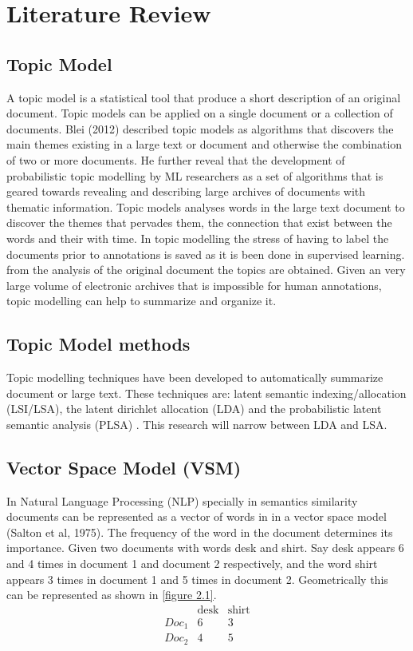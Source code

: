 \chapter{Literature Review}
\section{Topic Model}  
A topic model is a statistical tool that produce a short description of an original document. Topic models can be applied on a single document or a collection of documents. Blei (2012) described topic models as algorithms that discovers the main themes existing in a large text or document and otherwise the combination of two or more documents. He further reveal that the development of probabilistic topic modelling by ML  researchers as a set of algorithms that is geared towards revealing and describing large archives of documents with thematic information. Topic models analyses words in the large text document to discover the themes that pervades them, the connection that exist between the words and their with time. In topic modelling the stress of having to label the documents prior to annotations is saved as it is been done in supervised learning. from the analysis of the original document the topics are obtained. Given an very large volume of electronic archives that is impossible for human annotations, topic modelling can help to summarize and organize it.
\section{Topic Model methods}
Topic modelling techniques have been developed to automatically summarize document or large text. These techniques are: latent semantic indexing/allocation  (LSI/LSA), the latent dirichlet allocation (LDA) and the probabilistic latent semantic analysis (PLSA) . This research will narrow between LDA and LSA.
\section{Vector Space Model (VSM)}

In Natural Language Processing (NLP) specially in semantics similarity documents can be represented as a vector of words in in a vector space model (Salton et al, 1975). The frequency of the word in the document determines its importance. Given two documents with words  desk and shirt. Say desk appears 6 and 4 times in document 1 and document 2 respectively, and the word shirt appears 3 times in document 1 and 5 times in document 2. Geometrically this can be represented as shown in \eqref{figure 2.1}.
$$\begin{array}{cccc}
 &\text{desk} & \text{shirt} \\ 
 Doc_1 & 6 & 3\\ 
 Doc_2 & 4 & 5
\end{array} $$

